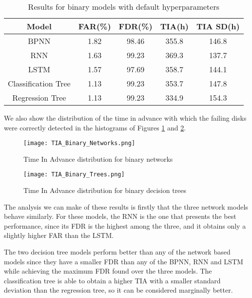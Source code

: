 \begin{table}
  \begin{center}
    \begin{tabular}{|c|c|c|c|c|}
      \hline
    Model & FAR(\%) & FDR(\%) & TIA(h) & TIA SD(h) \\
    \hline
    BPNN & 1.82 & 98.46 & 355.8 & 146.8 \\
    RNN & 1.63 & 99.23 & 369.3 & 137.7 \\
    LSTM & 1.57 & 97.69 & 358.7 & 144.1 \\
    Classification Tree & 1.13 & 99.23 & 353.7 & 147.8 \\
    Regression Tree & 1.13 & 99.23 & 334.9 & 154.3 \\
    \hline
    \end{tabular}
    \caption[Results Binary Models]{Results for binary models with default hyperparameters}
    \label{table:results_binary}
  \end{center}
\end{table}

We also show the distribution of the time in advance with which the failing disks were correctly detected in the histograms of Figures \ref{fig:tia_binary_network} and \ref{fig:tia_binary_tree}.

\begin{figure}
\begin{center}
  \texttt{[image: TIA\_Binary\_Networks.png]}
  \caption[TIA for binary networks]{Time In Advance distribution for binary networks}
  \label{fig:tia_binary_network}
\end{center}
\end{figure}

\begin{figure}
\begin{center}
  \texttt{[image: TIA\_Binary\_Trees.png]}
  \caption[TIA for binary decision trees]{Time In Advance distribution for binary decision trees}
  \label{fig:tia_binary_tree}
\end{center}
\end{figure}

The analysis we can make of these results is firstly that the three network models behave similarly.
For these models, the RNN is the one that presents the best performance, since its FDR is the highest among the three, and it obtains only a slightly higher FAR than the LSTM.

The two decision tree models perform better than any of the network based models since they have a smaller FDR than any of the BPNN, RNN and LSTM while achieving the maximum FDR found over the three models.
The classification tree is able to obtain a higher TIA with a smaller standard deviation than the regression tree, so it can be considered marginally better.


